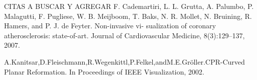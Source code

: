 CITAS A BUSCAR Y AGREGAR
F. Cademartiri, L. L. Grutta, A. Palumbo, P. Malagutti, F. Pugliese, W. B. Meijboom, T. Baks, N. R. Mollet, N. Bruining, R. Hamers, and P. J. de Feyter. Non-invasive vi- sualization of coronary atherosclerosis: state-of-art. Journal of Cardiovascular Medicine, 8(3):129–137, 2007.

A.Kanitsar,D.Fleischmann,R.Wegenkittl,P.Felkel,andM.E.Gröller.CPR-Curved Planar Reformation. In Proceedings of IEEE Visualization, 2002.
